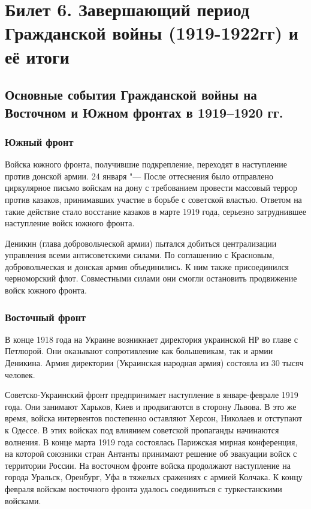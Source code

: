 \section{Билет 6. Завершающий период Гражданской войны (1919-1922гг) и её итоги}

\subsection{Основные события Гражданской войны на Восточном и Южном фронтах в 1919--1920 гг.}

\subsubsection{Южный фронт}

Войска южного фронта, получившие подкрепление, переходят в наступление против донской армии.
24 января "--- После оттеснения было отправлено циркулярное письмо войскам на дону с требованием провести массовый террор против казаков, принимавших участие в борьбе с советской властью.
Ответом на такие действие стало восстание казаков в марте 1919 года, серьезно затруднившее наступление войск южного фронта.

Деникин (глава добровольческой армии) пытался добиться централизации управления всеми антисоветскими силами. По соглашению с Красновым, добровольческая и донская армия объединились. К ним также присоединился черноморский флот. Совместными силами они смогли остановить продвижение войск южного фронта.

\subsubsection{Восточный фронт}

В конце 1918 года на Украине возникнает директория украинской НР во главе с Петлюрой. Они оказывают сопротивление как большевикам, так и армии Деникина.
Армия директории (Украинская народная армия) состояла из 30 тысяч человек.

Советско-Украинский фронт предпринимает наступление в январе-феврале 1919 года. Они занимают Харьков, Киев и продвигаются в сторону Львова.
В это же время, войска интервентов постепенно оставляют Херсон, Николаев и отступают к Одессе. В этих войсках под влиянием советской пропаганды начинаются волнения.
В конце марта 1919 года состоялась Парижская мирная конференция, на которой союзники стран Антанты принимают решение об эвакуации войск с территории России.
На восточном фронте войска продолжают наступление на города Уральск, Оренбург, Уфа в тяжелых сражениях с армией Колчака. К концу февраля войскам восточного фронта удалось соединиться с туркестанскими войсками.

